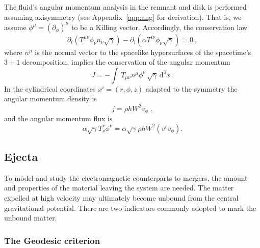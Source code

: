\documentclass[11pt,a4paper,headinclude=true,DIV=14,BCOR=8mm,chapterprefix,listof=totoc,twoside,openright,abstracton]{scrbook}
\newcommand{\dd}{\text{d}}
\begin{document}

The fluid's angular momentum analysis in the remnant and disk is performed
assuming axisymmetry (see Appendix~\ref{app:ang} for derivation).
 That is, we assume $\phi^{\mu} = (\partial_{\phi})^{\mu}$ to be a Killing
vector. Accordingly, the conservation law
\begin{equation}
\partial_t(T^{\mu\nu}\phi_{\nu}n_{\nu}\sqrt{\gamma}) -
\partial_i(\alpha T^{i \nu}\phi_{\nu}\sqrt{\gamma}) = 0 \ ,
\end{equation}
where $n^\mu$ is the normal vector to the spacelike hypersurfaces of
the spacetime's $3+1$ decomposition, 
implies the conservation of the angular momentum
\begin{equation}
J = %
-\int \,
T_{\mu\nu}n^{\mu}\phi^{\nu}\,\sqrt{\gamma}\, \dd^3 x\ .
\end{equation}
In the cylindrical coordinates $x^i=(r,\phi,z)$ adapted to the symmetry
the angular momentum density is  
\begin{equation}
j = %
\rho h W^2 v_{\phi} \ ,
\label{eq:method:ang_mom}
\end{equation}
and the angular momentum flux is 
\begin{equation}
\alpha\sqrt{\gamma}T^r _{\nu}\phi^{\nu} =
\alpha\sqrt{\gamma}\rho h W^2 (v^{r}v_{\phi}) .
\end{equation}


\subsection{Ejecta}


To model and study the electromagnetic counterparts to mergers, the amount and properties of the material
leaving the system are needed.
The matter expelled at high velocity may ultimately become unbound from the central gravitational
potential. There are two indicators commonly adopted to mark the unbound matter.

\subsubsection{The Geodesic criterion}
\end{document}
